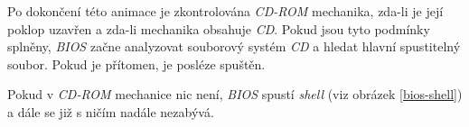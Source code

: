 Po dokončení této animace je zkontrolována \textit{CD-ROM} mechanika, zda-li je její poklop uzavřen a zda-li mechanika obsahuje \textit{CD}. 
Pokud jsou tyto podmínky splněny, \textit{BIOS} začne analyzovat souborový systém \textit{CD} a hledat hlavní spustitelný soubor. 
Pokud je přítomen, je posléze spuštěn.

Pokud v \textit{CD-ROM} mechanice nic není, \textit{BIOS} spustí \textit{shell} (viz obrázek \ref{bios-shell}) a dále se již s ničím nadále nezabývá.